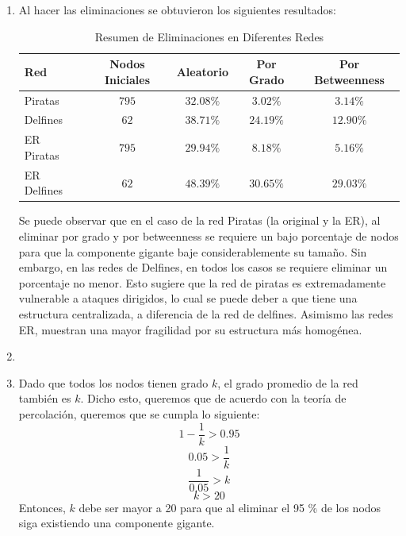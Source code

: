 \documentclass[12pt]{article}
\begin{document}
\begin{enumerate}
    \item Al hacer las eliminaciones se obtuvieron los siguientes resultados:
    \begin{table}[H]
        \footnotesize
        \centering
        \begin{tabular}{|l|c|c|c|c|}
            \hline
            \textbf{Red} & \textbf{Nodos Iniciales} & \textbf{Aleatorio} & \textbf{Por Grado} & \textbf{Por Betweenness} \\
            \hline
            Piratas & $795$ & $32.08\%$ & $3.02\%$ & $3.14\%$ \\
            \hline
            Delfines & $62$ & $38.71\%$ & $24.19\%$ & $12.90\%$ \\
            \hline
            ER Piratas & $795$ & $29.94\%$ & $8.18\%$ & $5.16\%$ \\
            \hline
            ER Delfines & $62$ & $48.39\%$ & $30.65\%$ & $29.03\%$ \\
            \hline
        \end{tabular}
        \caption{Resumen de Eliminaciones en Diferentes Redes}
        \label{tabla:resumen_eliminaciones}
    \end{table}
     Se puede observar que en el caso de la red Piratas (la original y la ER), al eliminar por grado y por betweenness se requiere un bajo porcentaje de nodos para que la componente gigante baje considerablemente su tamaño. Sin embargo, en las redes de Delfines, en todos los casos se requiere eliminar un porcentaje no menor. 
     Esto sugiere que la red de piratas es extremadamente vulnerable a ataques dirigidos, lo cual se puede deber a que tiene una estructura centralizada, a diferencia de la red de delfines. Asimismo las redes ER, muestran una mayor fragilidad por su estructura más homogénea.

    \item 
    
    \item Dado que todos los nodos tienen grado $k$, el grado promedio de la red también es $k$. Dicho esto, queremos que de acuerdo con la teoría de percolación, queremos que se cumpla lo siguiente: $$1-\frac{1}{k} > 0.95$$ $$0.05>\frac{1}{k}$$ $$\frac{1}{0.05}>k$$ $$k>20$$ Entonces, $k$ debe ser mayor a 20 para que al eliminar el 95 \% de los nodos siga existiendo una componente gigante.
    

\end{enumerate}
\end{document}
